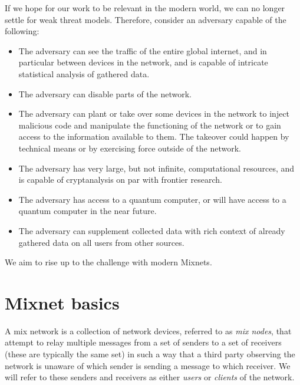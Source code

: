 \documentclass{article}
\begin{document}
If we hope for our work to be relevant in the modern world, we can no longer settle for weak threat models. Therefore, consider an adversary capable of the following:
\begin{itemize}
\item The adversary can see the traffic of the entire global internet, and in particular between devices in the network, and is capable of intricate statistical analysis of gathered data.
\item The adversary can disable parts of the network.
\item The adversary can plant or take over some devices in the network to inject malicious code and manipulate the functioning of the network or to gain access to the information available to them. The takeover could happen by technical means or by exercising force outside of the network.
\item The adversary has very large, but not infinite, computational resources, and is capable of cryptanalysis on par with frontier research.
\item The adversary has access to a quantum computer, or will have access to a quantum computer in the near future.
\item The adversary can supplement collected data with rich context of already gathered data on all users from other sources.
\end{itemize}

\noindent  We aim to rise up to the challenge with modern Mixnets.
\vfill

\pagebreak
\section{Mixnet basics}

A mix network is a collection of network devices, referred to as \textit{mix nodes}, that attempt to relay multiple messages from a set of senders to a set of receivers (these are typically the same set) in such a way that a third party observing the network is unaware of which sender is sending a message to which receiver. We will refer to these senders and receivers as either \textit{users} or \textit{clients} of the network. 
\end{document}
